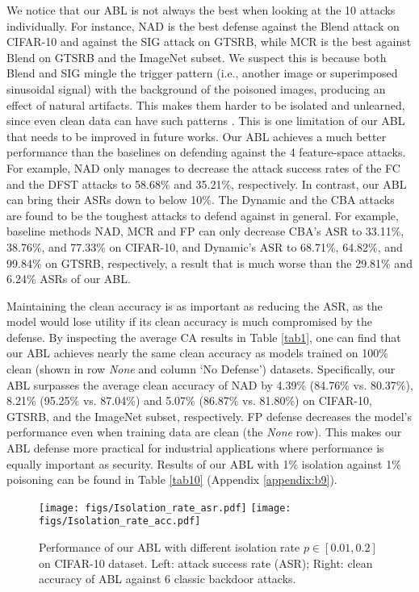 We notice that our ABL is not always the best when looking at the 10 attacks individually. For instance, NAD is the best defense against the Blend attack on CIFAR-10 and against the SIG attack on GTSRB, while MCR is the best against Blend on GTSRB and the ImageNet subset. We suspect this is because both Blend and SIG mingle the trigger pattern (i.e., another image or superimposed sinusoidal signal) with the background of the poisoned images, producing an effect of natural artifacts. This makes them harder to be isolated and unlearned, since even clean data can have such patterns \cite{zhao2021deep}. This is one limitation of our ABL that needs 
to be improved in future works. Our ABL achieves a much better performance than the baselines on defending against the 4 feature-space attacks. For example, NAD only manages to decrease the attack success rates of the FC and the DFST attacks to 58.68\% and 35.21\%, respectively. In contrast, our ABL can bring their ASRs down to below 10\%. 
The Dynamic and the CBA attacks are found to be the toughest attacks to defend against in general. For example, baseline methods NAD, MCR and FP can only decrease CBA's ASR to 33.11\%, 38.76\%, and 77.33\% on CIFAR-10, and Dynamic's ASR to 68.71\%, 64.82\%, and 99.84\% on GTSRB, respectively, a result that is much worse than the 29.81\% and 6.24\% ASRs of our ABL.

Maintaining the clean accuracy is as important as reducing the ASR, as the model would lose utility if its clean accuracy is much compromised by the defense. By inspecting the average CA results in Table \ref{tab1}, one can find that our ABL achieves nearly the same clean accuracy as models trained on 100\% clean (shown in row \emph{None} and column `No Defense') datasets. Specifically, our ABL surpasses the average clean accuracy of NAD by 4.39\% (84.76\% vs. 80.37\%), 8.21\% (95.25\% vs. 87.04\%) and 5.07\% (86.87\% vs. 81.80\%) on CIFAR-10, GTSRB, and the ImageNet subset, respectively. FP defense decreases the model's performance even when training data are clean (the \emph{None} row). This makes our ABL defense more practical for industrial applications where performance is equally important as security. Results of our ABL with 1\% isolation against 1\% poisoning can be found in Table \ref{tab10} (Appendix \ref{appendix:b9}).

\begin{figure}[!tp]
	\centering
	\texttt{[image: figs/Isolation\_rate\_asr.pdf]}
	\texttt{[image: figs/Isolation\_rate\_acc.pdf]}
	\vspace{-0.1 in}
	\caption{Performance of our ABL with different isolation rate $p \in [0.01, 0.2]$ on CIFAR-10 dataset. Left: attack success rate (ASR); Right: clean accuracy of ABL against 6 classic backdoor attacks.}
	\label{img3}
	\vspace{-0.1 in}
\end{figure}

